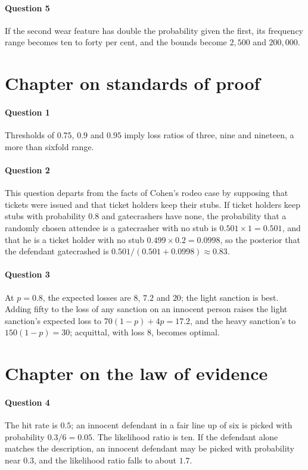 \paragraph{Question 5} If the second wear feature has double the probability given the first, its frequency range becomes ten to forty per cent, and the bounds become $2{,}500$ and $200{,}000$.

\section*{Chapter on standards of proof}
\paragraph{Question 1} Thresholds of $0.75$, $0.9$ and $0.95$ imply loss ratios of three, nine and nineteen, a more than sixfold range.
\paragraph{Question 2} This question departs from the facts of Cohen's rodeo case by supposing that tickets were issued and that ticket holders keep their stubs. If ticket holders keep stubs with probability $0.8$ and gatecrashers have none, the probability that a randomly chosen attendee is a gatecrasher with no stub is $0.501\times 1 = 0.501$, and that he is a ticket holder with no stub $0.499\times 0.2 = 0.0998$, so the posterior that the defendant gatecrashed is $0.501/(0.501 + 0.0998) \approx 0.83$.
\paragraph{Question 3} At $p = 0.8$, the expected losses are $8$, $7.2$ and $20$; the light sanction is best. Adding fifty to the loss of any sanction on an innocent person raises the light sanction's expected loss to $70(1-p) + 4p = 17.2$, and the heavy sanction's to $150(1-p) = 30$; acquittal, with loss $8$, becomes optimal.

\section*{Chapter on the law of evidence}
\paragraph{Question 4} The hit rate is $0.5$; an innocent defendant in a fair line up of six is picked with probability $0.3/6 = 0.05$. The likelihood ratio is ten. If the defendant alone matches the description, an innocent defendant may be picked with probability near $0.3$, and the likelihood ratio falls to about $1.7$.

